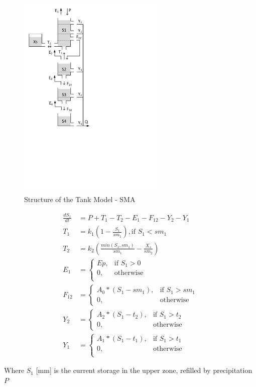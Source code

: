 { 																	%
\begin{figure}
\includegraphics[trim=1cm 10cm 7cm 1cm,width=7cm,keepaspectratio]{./AppA_files/38_schematic.pdf}
\caption{Structure of the Tank Model - SMA} \label{fig:38_schematic}
\end{figure}

\begin{align}
	\frac{dS_1}{dt} &= P+T_1-T_2-E_1-F_{12}-Y_2-Y_1 \\
	T_1 &= k_1\left(1-\frac{S_1}{sm_1}\right), \text{if } S_1 < sm_1\\
	T_2 &= k_2\left(\frac{min(S_1,sm_1)}{sm_1}-\frac{X_s}{sm_2}\right) \\
	E_1 &= \begin{cases}
		Ep, &\text{if } S_1 > 0 \\
		0, & \text{otherwise} \\
	\end{cases} \\
	F_{12} &= \begin{cases}
		A_0*(S_1-sm_1), & \text{if } S_1 > sm_1 \\
		0, & \text{otherwise}
	\end{cases}\\
	Y_2 &= 
	\begin{cases}
		A_2*(S_1-t_2), & \text{if } S_1 > t_2 \\
		0, & \text{otherwise}
	\end{cases}\\
	Y_1 &= 
	\begin{cases}
		A_1*(S_1-t_1), & \text{if } S_1 > t_1 \\
		0, & \text{otherwise}\\
	\end{cases}
\end{align}

Where $S_1$ [mm] is the current storage in the upper zone, refilled by precipitation $P$ 

} %

